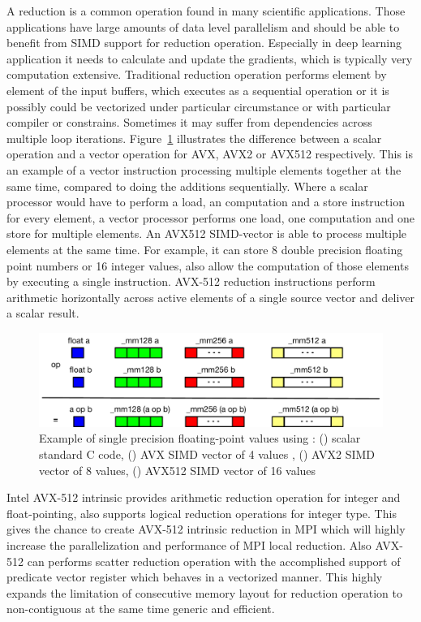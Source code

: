 \documentclass[sigconf,review]{acmart}
\newcommand{\mpi}[0]{\textsc{MPI}\xspace}
\begin{document}
A reduction is a common operation found in many scientific applications.
Those applications have large amounts of data level parallelism and should be able
to benefit from SIMD support for reduction operation. Especially in deep learning application
it needs to calculate and update the gradients, which is typically very computation extensive.
Traditional reduction operation performs element by element of the input buffers,
which executes as a sequential operation or it is possibly could be vectorized
under particular circumstance or with particular compiler or constrains. Sometimes
it may suffer from dependencies across multiple loop iterations.
Figure~\ref{fig:sse_avx} illustrates the difference between a scalar operation and
a vector operation for AVX, AVX2 or AVX512 respectively.
%
This is an example of a vector instruction processing multiple elements together at the same time,
compared to doing the additions sequentially. Where a scalar processor would have to perform a load, an
computation and a store instruction for every element, a vector processor performs one load, one computation and
one store for multiple elements.
An AVX512 SIMD-vector is able to process multiple elements at
the same time. For example, it can store 8 double precision floating point numbers or 16 integer values, also allow the computation of those elements by executing a single instruction.
AVX-512 reduction instructions perform arithmetic horizontally across active elements of a
single source vector and deliver a scalar result.

\begin{figure}[h]
    \centering
    \includegraphics[width=\linewidth]{sse_avx.pdf}
    \caption{Example of single precision floating-point values using : (\colorbox{blue}{}) scalar standard C code, (\colorbox{green}{}) AVX SIMD vector of 4 values , (\colorbox{red}{}) AVX2 SIMD vector of 8 values, (\colorbox{yellow}{}) AVX512 SIMD vector of 16 values}
    \label{fig:sse_avx}
\end{figure}

Intel AVX-512 intrinsic provides arithmetic
reduction operation for integer and float-pointing, also supports logical reduction
operations for integer type.
This gives the chance to create AVX-512 intrinsic reduction in \mpi which
will highly increase the parallelization and performance of \mpi local reduction.
Also AVX-512 can performs scatter reduction operation with the accomplished
support of predicate vector register which behaves in a vectorized manner. This highly
expands the limitation of consecutive memory layout for reduction operation to non-contiguous
at the same time generic and efficient.
\end{document}
